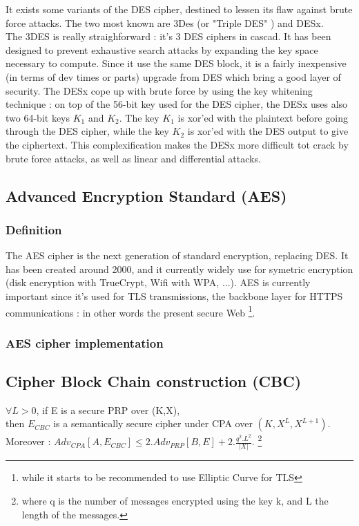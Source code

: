 It exists some variants of the DES cipher, destined to lessen its flaw against brute force attacks. The two most known are 3Des (or "Triple DES" ) and DESx. \\
The 3DES is really straighforward : it's 3 DES ciphers in cascad. It has been designed to prevent exhaustive search attacks by expanding the key space necessary to compute. Since it use the same DES block, it is a fairly inexpensive (in terms of dev times or parts) upgrade from DES which bring a good layer of security.
The DESx cope up with brute force by using the key whitening technique : on top of the 56-bit key used for the DES cipher, the DESx uses also two 64-bit keys $K_1$ and $K_2$. The key $K_1$ is xor'ed with the plaintext before going through the DES cipher, while the key $K_2$ is xor'ed with the DES output to give the ciphertext. This complexification makes the DESx more difficult tot crack by brute force attacks, as well as linear and differential attacks.

\subsection{Advanced Encryption Standard (AES)}

\subsubsection{Definition}

The AES cipher is the next generation of standard encryption, replacing DES. It has been created around 2000, and it currently widely use for symetric encryption (disk encryption with TrueCrypt, Wifi with WPA, ...). AES is currently important since it's used for TLS transmissions, the backbone layer for HTTPS communications : in other words the present secure Web \footnote{while it starts to be recommended to use Elliptic Curve for TLS}.

\subsubsection{ AES cipher implementation }


\subsection{Cipher Block Chain construction (CBC)}



\begin{mytheorem}
   $\forall L>0$, if E is a secure PRP over (K,X), \\
   then $E_{CBC}$ is a semantically secure cipher under CPA over $(K,X^L,X^{L+1})$. \\
 	Moreover : $Adv_{CPA}[A,E_{CBC}] \leq 2.Adv_{PRP}[B,E] + 2.\frac{q^2.L^2}{|X|} $. \footnote{where q is the number of messages encrypted using the key k, and L the length of the messages.}
\end{mytheorem}


